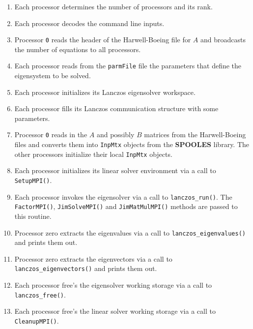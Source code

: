 \begin{enumerate}
\item
Each processor determines the number of processors and its rank.
\item
Each processor decodes the command line inputs.
\item
Processor {\tt 0} reads the
header of the Harwell-Boeing file for $A$
and broadcasts the number of equations to all processors.
\item
Each processor reads from the {\tt parmFile} file
the parameters that define the eigensystem to be solved.
\item
Each processor initializes its Lanczos eigensolver workspace.
\item
Each processor fills its
Lanczos communication structure with some parameters.
\item
Processor {\tt 0} reads in the $A$ and possibly $B$ matrices from the
Harwell-Boeing files and converts them into {\tt InpMtx} objects
from the {\bf SPOOLES} library.
The other processors initialize their local {\tt InpMtx} objects.
\item
Each processor initializes its linear solver environment 
via a call to {\tt SetupMPI()}.
\item
Each processor invokes
the eigensolver via a call to {\tt lanczos\_run()}.
The {\tt FactorMPI()}, {\tt JimSolveMPI()} 
and {\tt JimMatMulMPI()} methods are passed to this routine.
\item
Processor zero extracts the eigenvalues via a call to
{\tt lanczos\_eigenvalues()} and prints them out.
\item
Processor zero extracts the eigenvectors via a call to
{\tt lanczos\_eigenvectors()} and prints them out.
\item
Each processor free's
the eigensolver working storage via a call to {\tt lanczos\_free()}.
\item
Each processor free's
the linear solver working storage via a call to {\tt CleanupMPI()}.
\end{enumerate}
